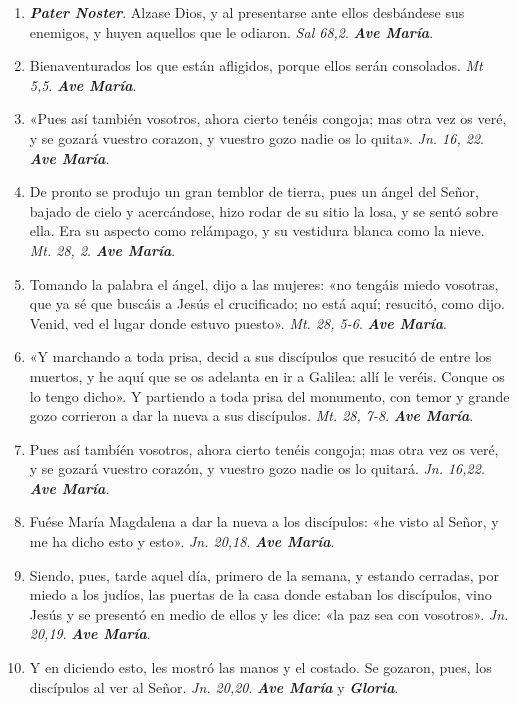 \documentclass[../../devocionario.tex]{subfiles}
\begin{document}
    \begin{enumerate}
    
        \item \textbf{\emph{Pater Noster}}. Alzase Dios, y al presentarse ante ellos desbándese sus enemigos, 
            y huyen aquellos que le odiaron. \emph{Sal 68,2}. \textbf{\emph{Ave María}}.

        \item Bienaventurados los que están afligidos, porque ellos serán consolados. \emph{Mt 5,5}. \textbf{\emph{Ave María}}.

        \item «Pues así también vosotros, ahora cierto tenéis congoja; mas otra vez os veré, y se gozará vuestro corazon, 
            y vuestro gozo nadie os lo quita». \emph{Jn. 16, 22}. \textbf{\emph{Ave María}}.

        \item De pronto se produjo un gran temblor de tierra, pues un ángel del Señor, bajado de cielo y acercándose, 
            hizo rodar de su sitio la losa, y se sentó sobre ella. Era su aspecto como relámpago, 
            y su vestidura blanca como la nieve. \emph{Mt. 28, 2}. \textbf{\emph{Ave María}}.

        \item Tomando la palabra el ángel, dijo a las mujeres: «no tengáis miedo vosotras, que ya sé que buscáis a Jesús el crucificado; 
            no está aquí; resucitó, como dijo. Venid, ved el lugar donde estuvo puesto». \emph{Mt. 28, 5-6}. \textbf{\emph{Ave María}}.

        \item «Y marchando a toda prisa, decid a sus discípulos que resucitó de entre los muertos, 
            y he aquí que se os adelanta en ir a Galilea: allí le veréis. Conque os lo tengo dicho». 
            Y partiendo a toda prisa del monumento, con temor y grande gozo corrieron a dar la nueva a sus discípulos. \emph{Mt. 28, 7-8}. \textbf{\emph{Ave María}}.

        \item Pues así tambíén vosotros, ahora cierto tenéis congoja; mas otra vez os veré, y se gozará vuestro corazón, 
            y vuestro gozo nadie os lo quitará. \emph{Jn. 16,22}. \textbf{\emph{Ave María}}.

        \item Fuése María Magdalena a dar la nueva a los discípulos: «he visto al Señor, 
            y me ha dicho esto y esto». \emph{Jn. 20,18}. \textbf{\emph{Ave María}}.

        \item Siendo, pues, tarde aquel día, primero de la semana, y estando cerradas, por miedo a los judíos, 
            las puertas de la casa donde estaban los discípulos, vino Jesús y se presentó en medio de ellos y 
            les dice: «la paz sea con vosotros». \emph{Jn. 20,19}. \textbf{\emph{Ave María}}.

        \item Y en diciendo esto, les mostró las manos y el costado. Se gozaron, pues, 
            los discípulos al ver al Señor. \emph{Jn. 20,20}. \textbf{\emph{Ave María}} y \textbf{\emph{Gloria}}.

    \end{enumerate}
\end{document}
